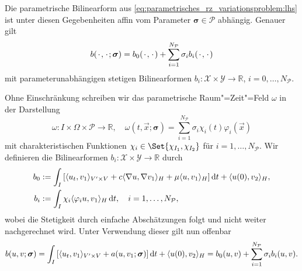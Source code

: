 \documentclass[../main.tex]{subfiles}
\begin{document}
\begin{Lemma}
\label{lemma:bilinearform_affin_parametrisch}
    Die parametrische Bilinearform aus \cref{eq:parametrisches_rz_variationsproblem:lhs} ist unter diesen Gegebenheiten affin vom Parameter $\bm \sigma \in \mathcal P$ abhängig.
    Genauer gilt
    \begin{equation}\label{eq:bilinearform_affin_parametrisch}
        b({\mkern2mu\cdot\mkern2mu}, {\mkern2mu\cdot\mkern2mu}; \bm \sigma) = b_{0}({\mkern2mu\cdot\mkern2mu}, {\mkern2mu\cdot\mkern2mu}) + \sum_{i = 1}^{N_{\mathcal P}} \sigma_{i} b_{i}({\mkern2mu\cdot\mkern2mu}, {\mkern2mu\cdot\mkern2mu})
    \end{equation}
    mit parameterunabhängigen stetigen Bilinearformen $b_{i} \colon \mathcal X \times \mathcal Y \to \mathbb{R}$, $i = 0, \dots, N_{\mathcal P}$.

    \begin{Beweis}
        Ohne Einschränkung schreiben wir das parametrische Raum"=Zeit"=Feld $\omega$ in der Darstellung
        \begin{equation}
            \omega \colon I \times \Omega \times \mathcal P \to \mathbb{R}, \quad
            \omega(t, \vec{x}; \bm \sigma) = \sum_{i = 1}^{N_{\mathcal P}} \sigma_{i} \chi_{i}(t) \varphi_{i}(\vec x)
        \end{equation}
        mit charakteristischen Funktionen $\chi_{i} \in \Set{\chi_{I_{1}}, \chi_{I_{2}}}$ für $i = 1, \dots, N_{\mathcal P}$.
        Wir definieren die Bilinearformen $b_{i} \colon \mathcal X \times \mathcal Y \to \mathbb{R}$ durch
        \begin{equation}
            \begin{aligned}
                b_{0} &:= \int_{I} \left[ \langle u_{t},v_{1}\rangle_{V' \times V} + c\langle\nabla u,\nabla v_{1}\rangle_{H} + \mu \langle u,v_{1}\rangle_{H} \right] \mathop{}\!\mathrm{d} t + \langle u(0),v_{2}\rangle_{H},\\
                b_{i} &:= \int_{I} \chi_{i} \langle\varphi_{i}u,v_{1}\rangle_{H} \mathop{}\!\mathrm{d} t, \quad i = 1, \dots, N_{\mathcal P},
            \end{aligned}
        \end{equation}
        wobei die Stetigkeit durch einfache Abschätzungen folgt und nicht weiter nachgerechnet wird.
        Unter Verwendung dieser gilt nun offenbar
        \begin{align}
                b(u, v; \bm \sigma)
                = \int_{I} \left[ \langle u_{t},v_{1}\rangle_{V' \times V} + a(u, v_{1}; \bm \sigma) \right] \mathop{}\!\mathrm{d} t + \langle u(0),v_{2}\rangle_{H}
                = b_{0}(u, v) + \sum_{i = 1}^{N_{\mathcal P}} \sigma_{i} b_{i}(u, v).
        \end{align}
    \end{Beweis}
\end{Lemma}
\end{document}
